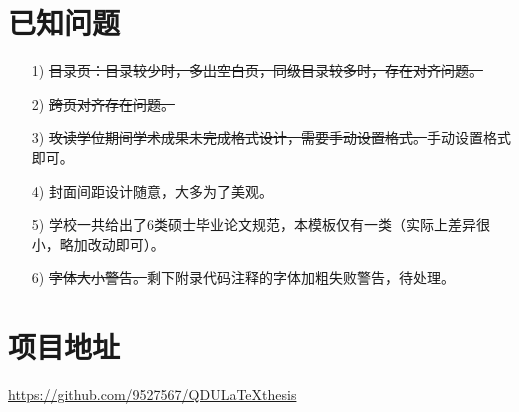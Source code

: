 \section{已知问题}
\begin{itemize}
	\item[1)] \sout{目录页：目录较少时，多出空白页，同级目录较多时，存在对齐问题。}
	\item[2)] \sout{跨页对齐存在问题。}
	\item[3)] \sout{攻读学位期间学术成果未完成格式设计，需要手动设置格式。}\quad 手动设置格式即可。
	\item[4)] 封面间距设计随意，大多为了美观。
	\item[5)] 学校一共给出了6类硕士毕业论文规范，本模板仅有一类（实际上差异很小，略加改动即可）。
	\item[6)] \sout{字体大小警告。}\quad 剩下附录代码注释的字体加粗失败警告，待处理。
\end{itemize}
\section{项目地址}
\url{https://github.com/9527567/QDULaTeXthesis}